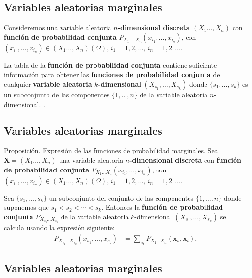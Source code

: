 \documentclass[]{book}
\begin{document}
\hypertarget{variables-aleatorias-marginales-3}{%
\subsection{Variables aleatorias marginales}\label{variables-aleatorias-marginales-3}}

Consideremos una variable aleatoria \textbf{\(n\)-dimensional discreta \((X_1\ldots,X_n)\)} con \textbf{función de probabilidad conjunta} \(P_{X_1\ldots,X_n}(x_{i_1},\ldots,x_{i_n})\), con \((x_{i_1},\ldots,x_{i_n})\in (X_1\ldots,X_n)(\Omega)\), \(i_1=1,2,\ldots\), \(i_n=1,2,\ldots\).

La tabla de la \textbf{función de probabilidad conjunta} contiene suficiente información para obtener las \textbf{funciones de probabilidad conjunta} de cualquier \textbf{variable aleatoria \(k\)-dimensional} \((X_{s_1},\ldots,X_{s_k})\) donde \(\{s_1,\ldots,s_k\}\) es un subconjunto de las componentes \(\{1,\ldots,n\}\) de la variable aleatoria \(n\)-dimensional. .

\hypertarget{variables-aleatorias-marginales-4}{%
\subsection{Variables aleatorias marginales}\label{variables-aleatorias-marginales-4}}

Proposición. Expresión de las funciones de probabilidad marginales.
Sea \(\mathbf{X}=(X_1\ldots,X_n)\) una variable aleatoria \textbf{\(n\)-dimensional discreta} con \textbf{función de probabilidad conjunta} \(P_{X_1\ldots X_n}(x_{i_1},\ldots,x_{i_n})\), con \((x_{i_1},\ldots,x_{i_n})\in (X_1\ldots,X_n)(\Omega)\), \(i_1=1,2,\ldots\), \(i_n=1,2,\ldots\).

Sea \(\{s_1,\ldots,s_k\}\) un subconjunto del conjunto de las componentes \(\{1,\ldots,n\}\) donde suponemos que \(s_1 < s_2<\cdots < s_k\). Entonces la \textbf{función de probabilidad conjunta} \(P_{X_{s_1}\ldots X_{s_k}}\) de la variable aleatoria \(k\)-dimensional \((X_{s_1},\ldots, X_{s_k})\) se calcula usando la expresión siguiente:
\[
\begin{array}{rl}
P_{X_{s_1}\ldots X_{s_k}}(x_{s_1},\ldots,x_{s_k})  & = \sum_{x_t} P_{X_1\ldots X_n}(\mathbf{x}_s,\mathbf{x}_t),
\end{array}
\]

\hypertarget{variables-aleatorias-marginales-5}{%
\subsection{Variables aleatorias marginales}\label{variables-aleatorias-marginales-5}}
\end{document}
